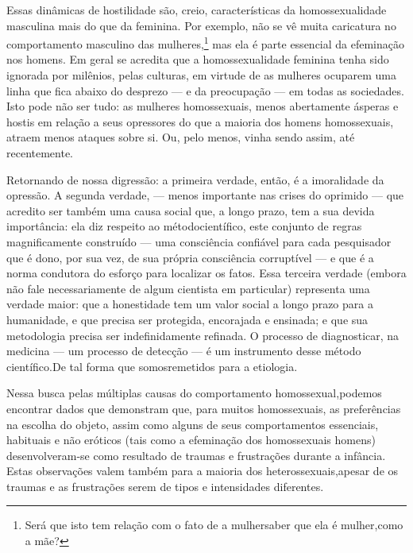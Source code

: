 Essas dinâmicas de hostilidade\idxhomoshost{} são, creio, características da
homossexualidade masculina mais do que da feminina.\idxlesb{} Por exemplo, não se
vê muita caricatura no comportamento\idxhomoslesb{} masculino das mulheres,\footnote{
Será que isto tem relação com o fato de a mulher\idxlesb[|nn] saber que ela é
mulher,\idxhomoslesb[|nn] como a mãe?} mas ela é parte essencial da efeminação nos
homens. Em geral se acredita que a homossexualidade feminina tenha sido
 ignorada por milênios, pelas culturas, em virtude de as mulheres
ocuparem uma linha que fica abaixo do desprezo --- e da preocupação
 --- em todas as sociedades. Isto pode não ser tudo: as mulheres
homossexuais, menos abertamente ásperas e hostis em relação a seus
opressores do que a maioria dos homens homossexuais, atraem menos
ataques sobre si. Ou, pelo menos, vinha sendo assim, até recentemente.

Retornando de nossa digressão: a primeira verdade, então, é a
imoralidade da opressão. A segunda verdade, --- menos importante nas
crises do oprimido --- que acredito ser também uma causa social que, a
longo prazo, tem a sua devida importância: ela diz respeito ao método\idxdiagmeto[|(]
científico,\idxmetod{} este conjunto de regras magnificamente construído --- uma
consciência confiável para cada pesquisador que é dono, por sua vez, de
sua própria consciência corruptível --- e que é a norma condutora do
esforço para localizar os fatos. Essa terceira verdade (embora não fale
necessariamente de algum cientista em particular) representa uma
verdade maior: que a honestidade tem um valor social a longo prazo para
a humanidade, e que precisa ser protegida, encorajada e ensinada; e que
sua metodologia precisa ser indefinidamente refinada. O processo de
diagnosticar, na medicina --- um processo de detecção --- é um
instrumento desse método científico.\idxdiagmeto[|)] De tal forma que somos\idxhomosaspe[|)] remetidos
para a\idxhomosetio{} etiologia.

Nessa busca pelas múltiplas causas do comportamento homossexual,\idxheterohomo[|(]
podemos encontrar dados que demonstram que, para muitos homossexuais,
as preferências na escolha do objeto, assim como alguns de seus
comportamentos essenciais, habituais e não eróticos (tais como a
efeminação\idxhomosafem{} dos homossexuais homens) desenvolveram-se como resultado de
traumas e frustrações durante a infância. Estas observações valem
também para a maioria dos heterossexuais,\idxhomoshete[|(] apesar de os traumas e as
frustrações serem de tipos e intensidades diferentes.

